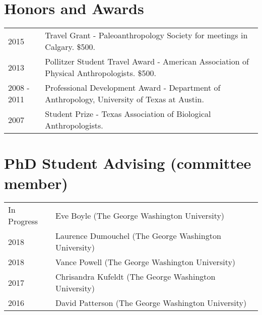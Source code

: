 \documentclass{article}
\begin{document}
\section*{Honors and Awards}

\begin{tabular}{p{}p{}}
2015 & Travel Grant - Paleoanthropology Society for meetings in Calgary. \$500.\\[4pt]
2013 & Pollitzer Student Travel Award - American Association of Physical Anthropologists. \$500.\\[4pt]
2008 - 2011 & Professional Development Award - Department of Anthropology, University of Texas at Austin.\\[4pt]
2007 & Student Prize - Texas Association of Biological Anthropologists.\\
\end{tabular}




\section*{PhD Student Advising (committee member)}
\begin{tabular}{p{}p{}}
In Progress & Eve Boyle (The George Washington University)\\[4pt]
2018 & Laurence Dumouchel (The George Washington University)\\[4pt]
2018 & Vance Powell (The George Washington University)\\[4pt]
2017 & Chrisandra Kufeldt (The George Washington University)\\[4pt]
2016 & David Patterson (The George Washington University)\\

\end{tabular}
\end{document}
